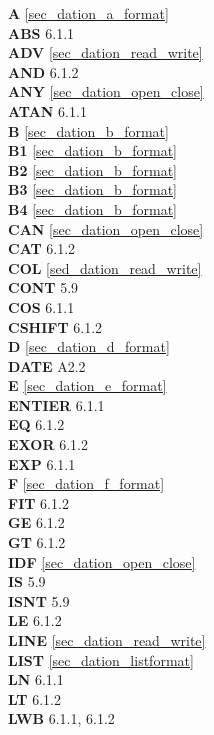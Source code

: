 {
{\bf A} \ref{sec_dation_a_format}\\
{\bf ABS} 6.1.1\\
{\bf ADV} \ref{sec_dation_read_write}\\
{\bf AND} 6.1.2\\
{\bf ANY} \ref{sec_dation_open_close}\\
{\bf ATAN} 6.1.1\\

{\bf B} \ref{sec_dation_b_format}\\
{\bf B1} \ref{sec_dation_b_format}\\
{\bf B2} \ref{sec_dation_b_format}\\
{\bf B3} \ref{sec_dation_b_format}\\
{\bf B4} \ref{sec_dation_b_format}\\

{\bf CAN} \ref{sec_dation_open_close}\\
{\bf CAT} 6.1.2\\
{\bf COL} \ref{sed_dation_read_write}\\
{\bf CONT} 5.9\\
{\bf COS} 6.1.1\\
{\bf CSHIFT} 6.1.2\\
 
{\bf D} \ref{sec_dation_d_format}\\
{\bf DATE} A2.2\\
 
{\bf E} \ref{sec_dation_e_format}\\
{\bf ENTIER} 6.1.1\\
{\bf EQ} 6.1.2\\
{\bf EXOR} 6.1.2\\
{\bf EXP} 6.1.1\\
 
{\bf F} \ref{sec_dation_f_format}\\
{\bf FIT} 6.1.2\\
 
{\bf GE} 6.1.2\\
{\bf GT} 6.1.2\\
 
{\bf IDF} \ref{sec_dation_open_close}\\
{\bf IS} 5.9\\
{\bf ISNT} 5.9\\

 
{\bf LE} 6.1.2\\
{\bf LINE} \ref{sec_dation_read_write}\\
{\bf LIST} \ref{sec_dation_listformat}\\
{\bf LN} 6.1.1\\
{\bf LT} 6.1.2\\
{\bf LWB} 6.1.1, 6.1.2\\
 
}
